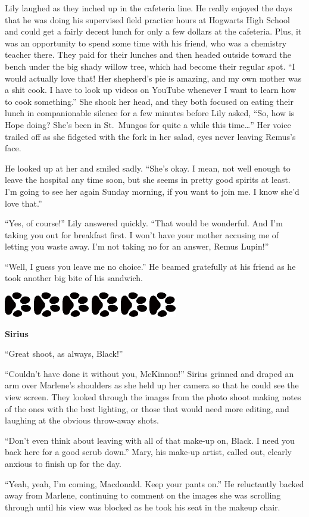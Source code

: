 \documentclass[12pt,twoside,openright]{memoir}
\newcommand{\myrulez}{	
	\begin{center}
		\hspace{.5em}
		\includegraphics[angle=60]{dogprint.pdf}
		\hspace{.5em}
		\includegraphics[angle=120]{dogprint.pdf}
		\hspace{.5em}
		\includegraphics[angle=60]{dogprint.pdf}
		\hspace{.5em}
		\includegraphics[angle=120]{dogprint.pdf}
		\hspace{.5em}
		\includegraphics[angle=60]{dogprint.pdf}
		\hspace{.5em}
		\includegraphics[angle=120]{dogprint.pdf}
		\hspace{.5em}
	\end{center}
}
\begin{document}
Lily laughed as they inched up in the cafeteria line. He really enjoyed the days that he was doing his supervised field practice hours at Hogwarts High School and could get a fairly decent lunch for only a few dollars at the cafeteria. Plus, it was an opportunity to spend some time with his friend, who was a chemistry teacher there. They paid for their lunches and then headed outside toward the bench under the big shady willow tree, which had become their regular spot.
``I would actually love that! Her shepherd's pie is amazing, and my own mother was a shit cook. I have to look up videos on YouTube whenever I want to learn how to cook something.'' She shook her head, and they both focused on eating their lunch in companionable silence for a few minutes before Lily asked, ``So, how is Hope doing? She's been in St.\ Mungos for quite a while this time…'' Her voice trailed off as she fidgeted with the fork in her salad, eyes never leaving Remus's face. 

He looked up at her and smiled sadly. ``She's okay. I mean, not well enough to leave the hospital any time soon, but she seems in pretty good spirits at least. I'm going to see her again Sunday morning, if you want to join me. I know she'd love that.''

``Yes, of course!'' Lily answered quickly. ``That would be wonderful. And I'm taking you out for breakfast first. I won't have your mother accusing me of letting you waste away. I'm not taking no for an answer, Remus Lupin!'' 

``Well, I guess you leave me no choice.'' He beamed gratefully at his friend as he took another big bite of his sandwich. 

\myrulez

\textbf{Sirius} 

``Great shoot, as always, Black!''

``Couldn't have done it without you, McKinnon!'' Sirius grinned and draped an arm over Marlene's shoulders as she held up her camera so that he could see the view screen. They looked through the images from the photo shoot making notes of the ones with the best lighting, or those that would need more editing, and laughing at the obvious throw-away shots. 

``Don't even think about leaving with all of that make-up on, Black. I need you back here for a good scrub down.'' Mary, his make-up artist, called out, clearly anxious to finish up for the day.

``Yeah, yeah, I'm coming, Macdonald. Keep your pants on.'' He reluctantly backed away from Marlene, continuing to comment on the images she was scrolling through until his view was blocked as he took his seat in the makeup chair. 
\end{document}
